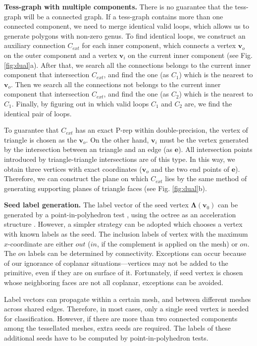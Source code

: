 \vspace{0.5em}
\noindent\textbf{Tess-graph with multiple components. }
There is no guarantee that the tess-graph will be a connected graph. If a tess-graph contains more than one connected component, we need to merge identical valid loops, which allows us to generate polygons with non-zero genus. To find identical loops, we construct an auxiliary connection $C_{ext}$ for each inner component, which connects a vertex $\bm{v}_o$ on the outer component and a vertex $\bm{v}_i$ on the current inner component (see Fig. \ref{fig:dual}a). After that, we search all the connections belongs to the current inner component that intersection $C_{ext}$, and find the one (as $C_1$) which is the nearest to $\bm{v}_o$. Then we search all the connections not belongs to the current inner component that intersection $C_{ext}$, and find the one (as $C_2$) which is the nearest to $C_1$. Finally, by figuring out in which valid loops $C_1$ and $C_2$ are, we find the identical pair of loops.

To guarantee that $C_{ext}$ has an exact P-rep within double-precision, the vertex of triangle is chosen as the $\bm{v}_o$. On the other hand, $\bm{v}_i$ must be the vertex generated by the intersection between an triangle and an edge (as $\bm{e}$). All intersection points introduced by triangle-triangle intersections are of this type. In this way, we obtain three vertices with exact coordinates ($\bm{v}_o$ and the two end points of $\bm{e}$). Therefore, we can construct the plane on which $C_{ext}$ lies by the same method of generating supporting planes of triangle faces (see Fig. \ref{fig:dual}b).

\vspace{0.5em}
\noindent\textbf{Seed label generation. }
The label vector of the seed vertex $\bm{\Lambda}(\bm{v}_0)$ can be generated by a point-in-polyhedron test \cite{ogayar2005point}, using the octree as an acceleration structure \cite{frisken2002simple}. However, a simpler strategy can be adopted which chooses a vertex with known labels as the seed. The inclusion labels of vertex with the maximum $x$-coordinate are either $out$ ($in$, if the complement is applied on the mesh) or $on$. The $on$ labels can be determined by connectivity. Exceptions can occur because of our ignorance of coplanar situations---vertices may not be added to the primitive, even if they are on surface of it. Fortunately, if seed vertex is chosen whose neighboring faces are not all coplanar, exceptions can be avoided.

Label vectors can propagate within a certain mesh, and between different meshes across shared edges. Therefore, in most cases, only a single seed vertex is needed for classification. However, if there are more than two connected components among the tessellated meshes, extra seeds are required. The labels of these additional seeds have to be computed by point-in-polyhedron tests.

